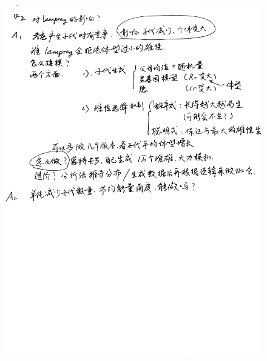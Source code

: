 \documentclass[11pt]{article}
\begin{document}
\begin{figure}[h]
    \includegraphics[height=\textheight]{2.jpg}
\end{figure}
\end{document}
